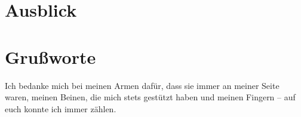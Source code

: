 \documentclass[10pt,a4paper]{article}
\begin{document}
\section{Ausblick}
\section{Grußworte}
Ich bedanke mich bei meinen Armen dafür, dass sie immer an meiner Seite waren, meinen Beinen, die mich stets gestützt haben und meinen Fingern -- auf euch konnte ich immer zählen.
%
\end{document}
